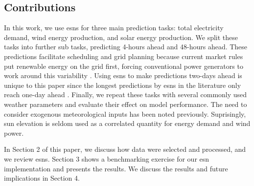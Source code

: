 \subsection{Contributions}
In this work, we use \glspl{esn} for three main prediction tasks: total
electricity demand, wind energy production, and solar energy production. We
split these tasks into further sub tasks, predicting 4-hours ahead and 48-hours
ahead. These predictions facilitate scheduling and grid planning
because current market rules put renewable energy on the grid first, forcing
conventional power generators to work around this variability
\cite{wang_quantifying_2016}. Using \glspl{esn} to make predictions two-days
ahead is unique to this paper since the longest predictions by \glspl{esn} in
the literature only reach one-day ahead \cite{deihimi_application_2012}.
Finally, we repeat these tasks with several commonly used weather parameters
and evaluate their effect on model performance. The need to consider exogenous
meteorological inputs has been noted previously. Suprisingly, sun elevation is
seldom used as a correlated quantity for energy demand and wind power.

In Section 2 of this paper, we discuss how data
were selected and processed, and we review \glspl{esn}. Section 3 shows a
benchmarking
exercise for our \gls{esn} implementation and presents the results. We discuss
the results and future implications in Section 4.
